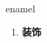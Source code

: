 
\begin{frame}
{\huge enamel}
\begin{center}
\begin{enumerate}\Large
  \item \textbf{装饰}
\end{enumerate}
\end{center}
\end{frame}
